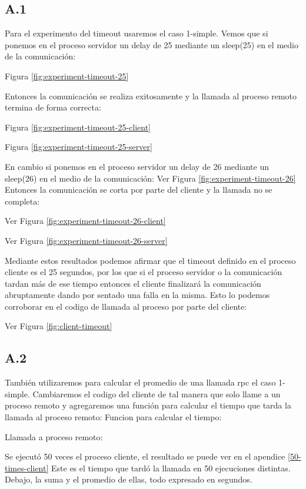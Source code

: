 \documentclass[12pt,journal,compsoc]{IEEEtran}
\begin{document}
\subsection{A.1}
Para el experimento del timeout usaremos el caso 1-simple. 
Vemos que si ponemos en el proceso servidor un delay de 25 mediante un sleep(25) en el medio de la comunicación:

Figura \ref{fig:experiment-timeout-25}

Entonces la comunicación se realiza exitosamente y la llamada al proceso remoto termina de forma correcta:

Figura \ref{fig:experiment-timeout-25-client}

Figura \ref{fig:experiment-timeout-25-server}

En cambio si ponemos en el proceso servidor un delay de 26 mediante un sleep(26) en el medio de la comunicación:
Ver Figura \ref{fig:experiment-timeout-26}
Entonces la comunicación se corta por parte del cliente y la llamada no se completa:

Ver Figura \ref{fig:experiment-timeout-26-client}

Ver Figura \ref{fig:experiment-timeout-26-server} 

Mediante estos resultados podemos afirmar que el timeout definido en el proceso cliente es el 25 segundos, por los que si el proceso servidor o la comunicación tardan más de ese tiempo entonces el cliente finalizará la comunicación abruptamente dando por sentado una falla en la misma.
Esto lo podemos corroborar en el codigo de llamada al proceso por parte del cliente:

Ver Figura \ref{fig:client-timeout}

\subsection{A.2}
También utilizaremos para calcular el promedio de una llamada rpc el caso 1-simple. Cambiaremos el codigo del cliente de tal manera que solo llame a un proceso remoto y agregaremos una función para calcular el tiempo que tarda la llamada al proceso remoto:
Funcion para calcular el tiempo:


Llamada a proceso remoto:


Se ejecutó 50 veces el proceso cliente, el resultado se puede ver en el apendice \ref{50-times-client}
Este es el tiempo que tardó la llamada en 50 ejecuciones distintas. Debajo, la suma y el promedio de ellas, todo expresado en segundos.
\end{document}
